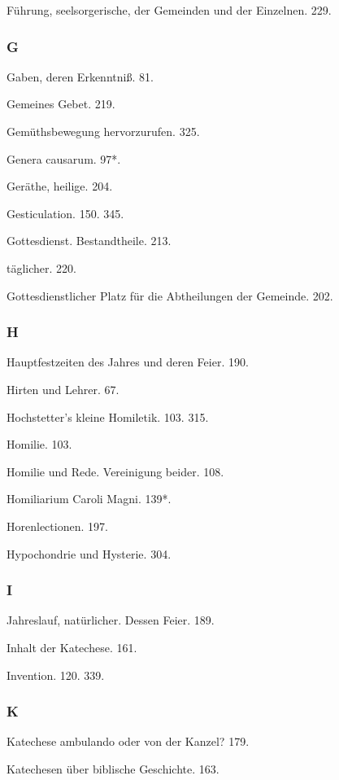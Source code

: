 Führung, seelsorgerische, der Gemeinden und der Einzelnen. 229.

\subsubsection{G}

Gaben, deren Erkenntniß. 81.

Gemeines Gebet. 219.

Gemüthsbewegung hervorzurufen. 325.

Genera causarum. 97*.

Geräthe, heilige. 204.

Gesticulation. 150. 345.

Gottesdienst. Bestandtheile. 213.

täglicher. 220.

Gottesdienstlicher Platz für die Abtheilungen der Gemeinde. 202.

\subsubsection{H}

Hauptfestzeiten des Jahres und deren Feier. 190.

Hirten und Lehrer. 67.

Hochstetter’s kleine Homiletik. 103. 315.

Homilie. 103.

Homilie und Rede. Vereinigung beider. 108.

Homiliarium Caroli Magni. 139*.

Horenlectionen. 197.

Hypochondrie und Hysterie. 304.

\subsubsection{I}

Jahreslauf, natürlicher. Dessen Feier. 189.

Inhalt der Katechese. 161.

Invention. 120. 339.

\subsubsection{K}

Katechese ambulando oder von der Kanzel? 179.

Katechesen über biblische Geschichte. 163.

